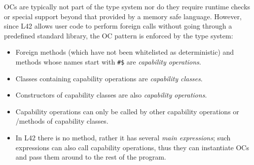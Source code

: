 OCs are typically not part of the type system nor do they require runtime checks or special support beyond that provided by a memory safe language. However, since
L42 allows user code to perform foreign calls without going through a predefined standard library, 
the OC pattern is enforced by the type system:
\begin{itemize}
\item Foreign methods (which have not been whitelisted as deterministic) and methods whose names start with \texttt{\#\$} are \emph{capability operations}.
\item Classes containing capability operations are \emph{capability classes}.
\item Constructors of capability classes are also \emph{capability operations}.
\item Capability operations can only be called by other capability operations or \Q@mut@/\Q@capsule@ methods of capability classes.
\item In L42 there is no \Q@main@ method, rather it has several \emph{main expressions}; such expressions can also call capability operations, thus they can instantiate OCs and pass them around to the rest of the program.

\end{itemize}



